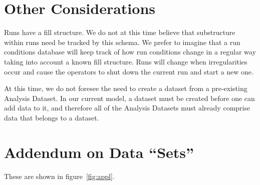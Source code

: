 \documentclass{cmspaper}
\begin{document}
{\section{Other Considerations}

Runs have a fill structure.  We do not at this time believe that
substructure within runs need be tracked by this schema.  We prefer
to imagine that a run conditions database will keep track of how run
conditions change in a regular way taking into account a known fill
structure.  Runs will change when irregularities occur and cause the
operators to shut down the current run and start a new one.

At this time, we do not foresee the need to create a dataset from a
pre-existing Analysis Dataset.  In our current model, a dataset must be
created before one can add data to it, and therefore all of the Analysis
Datasets must already comprise data that belongs to a dataset.


\appendix



\section{Addendum on Data ``Sets''}\label{appendix}

These are shown in figure~\ref{fig:appl}.

}
\end{document}
